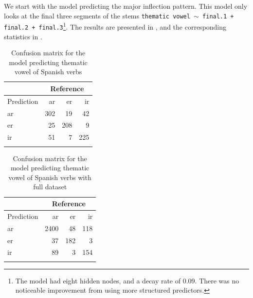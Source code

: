We start with the model predicting the major inflection pattern. This model only looks at the final three segments of the stems \texttt{thematic vowel $\sim$ final.1 + final.2 + final.3}\footnote{The model had eight hidden nodes, and a decay rate of 0.09. There was no noticeable improvement from using more structured predictors.}. The results are presented in , and the corresponding statistics in .


    
\begin{table}
    
    \begin{tabular}{lrrr}
      \lsptoprule
      & \multicolumn{3}{c}{Reference} \\
      \midrule
      Prediction & ar  & er  & ir                \\
      ar         & 302 & 19  & 42                \\
      er         & 25  & 208 & 9                 \\
      ir         & 51  & 7   & 225               \\
      \lspbottomrule
    \end{tabular}
    \caption{Confusion matrix for the model predicting thematic vowel of Spanish verbs}
    \label{tab:spanish-verbs-theme-v}
\end{table}

\begin{table}

    
    \begin{tabular}{lrrr}
      \lsptoprule
      & \multicolumn{3}{c}{Reference} \\
      \midrule
      Prediction & ar   & er  & ir               \\
      ar         & 2400 & 48  & 118              \\
      er         & 37   & 182 & 3                \\
      ir         & 89   & 3   & 154              \\
      \lspbottomrule
    \end{tabular}
    \caption{Confusion matrix for the model predicting thematic vowel of Spanish verbs with full dataset}
    \label{tab:spanish-verbs-theme-v-2}
\end{table}

